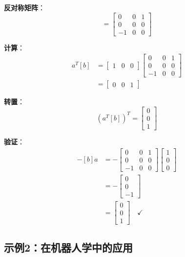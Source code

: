 \documentclass[12pt,a4paper]{article}
\begin{document}
\textbf{反对称矩阵}：
\begin{equation}
[b] = \begin{bmatrix}
0 & 0 & 1 \\
0 & 0 & 0 \\
-1 & 0 & 0
\end{bmatrix}
\end{equation}

\textbf{计算}：
\begin{align}
a^T [b] &= \begin{bmatrix} 1 & 0 & 0 \end{bmatrix} \begin{bmatrix}
0 & 0 & 1 \\
0 & 0 & 0 \\
-1 & 0 & 0
\end{bmatrix} \\
&= \begin{bmatrix} 0 & 0 & 1 \end{bmatrix}
\end{align}

\textbf{转置}：
\begin{equation}
(a^T [b])^T = \begin{bmatrix} 0 \\ 0 \\ 1 \end{bmatrix}
\end{equation}

\textbf{验证}：
\begin{align}
-[b] a &= -\begin{bmatrix}
0 & 0 & 1 \\
0 & 0 & 0 \\
-1 & 0 & 0
\end{bmatrix} \begin{bmatrix} 1 \\ 0 \\ 0 \end{bmatrix} \\
&= -\begin{bmatrix} 0 \\ 0 \\ -1 \end{bmatrix} \\
&= \begin{bmatrix} 0 \\ 0 \\ 1 \end{bmatrix} \quad \checkmark
\end{align}

\subsection{示例2：在机器人学中的应用}
\end{document}
